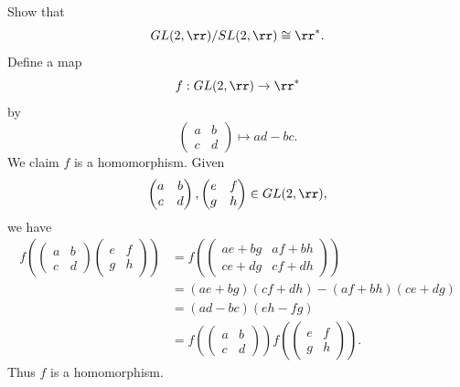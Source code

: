 \begin{problem}[Exercise 16]{
    Show that
    \[
        GL(2,\rr)/SL(2,\rr) \cong \rr^*.
    \]
}
    Define a map
    \[
        f : GL(2,\rr) \to \rr^*
    \]
    by
    \[
        \begin{pmatrix}
            a & b\\
            c & d
        \end{pmatrix}
        \mapsto ad-bc.
    \]
    We claim $f$ is a homomorphism.
    Given
    \[
        \begin{pmatrix}
            a & b\\
            c & d
        \end{pmatrix},
        \begin{pmatrix}
            e & f\\
            g & h
        \end{pmatrix}
        \in GL(2,\rr),
    \]
    we have
    \begin{align*}
        f\left(
             \begin{pmatrix}
                 a & b\\
                 c & d
             \end{pmatrix}
             \begin{pmatrix}
                 e & f\\
                 g & h
             \end{pmatrix}
        \right)
        &=
        f\left(
             \begin{pmatrix}
                 ae+bg & af+bh\\
                 ce+dg & cf+dh
             \end{pmatrix}
        \right)\\
        &=
        (ae+bg)(cf+dh) - (af+bh)(ce+dg)\\
        &=
        (ad-bc)(eh-fg)\\
        &=
        f\left(
             \begin{pmatrix}
                 a & b\\
                 c & d
             \end{pmatrix}
        \right)
        f\left(
             \begin{pmatrix}
                 e & f\\
                 g & h
             \end{pmatrix}
        \right).
    \end{align*}
    Thus $f$ is a homomorphism.

\end{problem}
